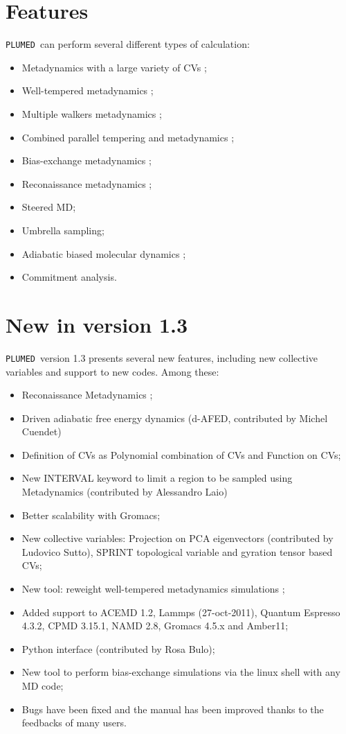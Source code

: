 \documentclass[12pt,fleqn]{report}
\newcommand{\plumed}{{\tt PLUMED}}
\begin{document}
\section{Features}
\label{sec.overview}

\plumed \ can perform several different types of calculation:
\begin{itemize}
\item Metadynamics with a large variety of CVs \cite{metad};
\item Well-tempered metadynamics \cite{Barducci:2008};
\item Multiple walkers metadynamics \cite{multiplewalkers};
\item Combined parallel tempering and metadynamics \cite{bussi_xc};
\item Bias-exchange metadynamics \cite{piana};
\item Reconaissance metadynamics \cite{tribello-recon};
\item Steered MD;
\item Umbrella sampling;
\item Adiabatic biased molecular dynamics \cite{ballone};
\item Commitment analysis.
\end{itemize}

\section{New in version 1.3}
\plumed  \ version  1.3 presents several new features, including new collective variables and 
support to new codes. Among these:
\begin{itemize}
\item Reconaissance Metadynamics \cite{tribello-recon};
\item Driven adiabatic free energy dynamics (d-AFED, contributed by Michel Cuendet)
\item Definition of CVs as Polynomial combination of CVs and Function on CVs;
\item New INTERVAL keyword to limit a region to be sampled using Metadynamics (contributed by Alessandro Laio)
\item Better scalability with Gromacs;
\item New collective variables: Projection on PCA eigenvectors (contributed by Ludovico Sutto), SPRINT topological variable and gyration tensor based CVs;
\item New tool: reweight well-tempered metadynamics simulations \cite{Bonomi:2009p17105};
\item Added support to ACEMD 1.2, Lammps (27-oct-2011), Quantum Espresso 4.3.2, CPMD 3.15.1, NAMD 2.8, Gromacs 4.5.x and Amber11;
\item Python interface (contributed by Rosa Bulo);
\item New tool to perform bias-exchange simulations via the linux shell with any MD code;
\item Bugs have been fixed and the manual has been improved thanks to the feedbacks of many users.
\end{itemize}
\end{document}
